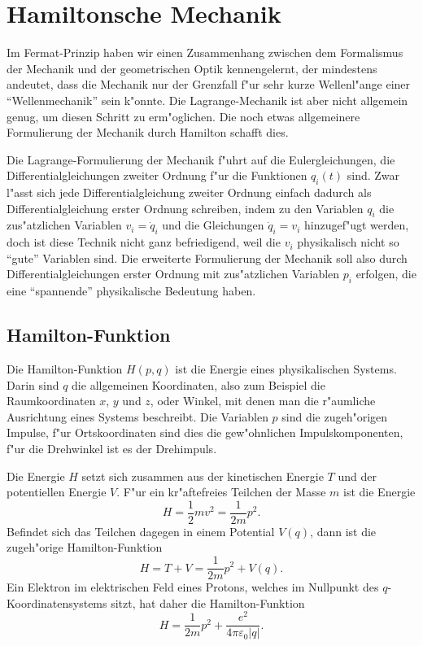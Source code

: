 \section{Hamiltonsche Mechanik}
Im Fermat-Prinzip haben wir einen Zusammenhang zwischen dem Formalismus
der Mechanik und der geometrischen Optik kennengelernt, der mindestens
andeutet, dass die Mechanik nur der Grenzfall f"ur sehr kurze Wellenl"ange
einer ``Wellenmechanik'' sein k"onnte.
Die Lagrange-Mechanik ist aber nicht allgemein genug, um diesen
Schritt zu erm"oglichen.
Die noch etwas allgemeinere Formulierung der Mechanik durch Hamilton
schafft dies.

Die Lagrange-Formulierung der Mechanik f"uhrt auf die Eulergleichungen,
die Differentialgleichungen zweiter Ordnung f"ur die Funktionen $q_i(t)$ 
sind.
Zwar l"asst sich jede Differentialgleichung zweiter Ordnung einfach
dadurch als Differentialgleichung erster Ordnung schreiben, indem
zu den Variablen $q_i$ die zus"atzlichen Variablen $v_i=\dot q_i$ und die
Gleichungen $\dot q_i=v_i$ hinzugef"ugt werden, doch ist diese Technik
nicht ganz befriedigend, weil die $v_i$ physikalisch nicht so ``gute''
Variablen sind.
Die erweiterte Formulierung der Mechanik soll also durch
Differentialgleichungen erster Ordnung mit zus"atzlichen
Variablen $p_i$ erfolgen, die eine ``spannende'' physikalische
Bedeutung haben.

\subsection{Hamilton-Funktion}
Die Hamilton-Funktion $H(p,q)$ ist die Energie eines physikalischen
Systems. Darin sind $q$ die allgemeinen Koordinaten, also
zum Beispiel die Raumkoordinaten $x$, $y$ und $z$, oder Winkel, mit
denen man die r"aumliche Ausrichtung eines Systems beschreibt.
Die Variablen $p$ sind die zugeh"origen Impulse, f"ur Ortskoordinaten
sind dies die gew"ohnlichen Impulskomponenten, f"ur die Drehwinkel ist
es der Drehimpuls.

Die Energie $H$ setzt sich zusammen aus der kinetischen Energie $T$ und der
potentiellen Energie $V$. F"ur ein kr"aftefreies Teilchen der Masse $m$
ist die Energie 
\[
H=\frac12mv^2=\frac1{2m}p^2.
\]
Befindet sich das Teilchen dagegen in einem Potential $V(q)$, dann 
ist die zugeh"orige Hamilton-Funktion
\begin{equation}
H=T+V=\frac1{2m}p^2+V(q).
\label{skript:hamilton-potential}
\end{equation}
Ein Elektron im elektrischen Feld eines Protons, welches im Nullpunkt
des $q$-Koordinatensystems sitzt, hat daher die Hamilton-Funktion
\[
H=\frac1{2m}p^2+\frac{e^2}{4\pi\varepsilon_0|q|}.
\]

